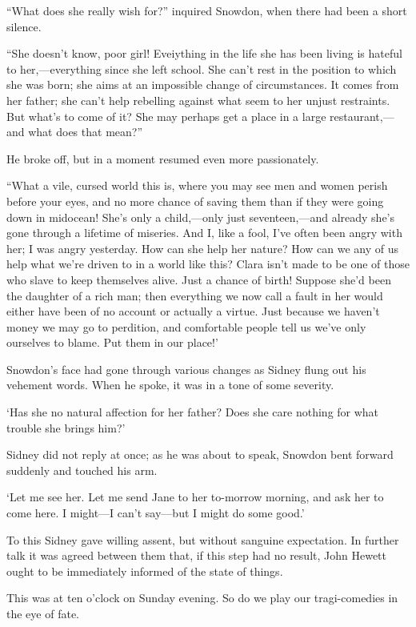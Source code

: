 ``What does she really wish for?'' inquired Snowdon, when there had been
a short silence.

``She doesn't know, poor girl! Eveiything in the life she has been
living is hateful to her,---everything since she left school. She can't
rest in the position to which she was born; she aims at an impossible
change of circumstances. It comes from her father; she can't help
rebelling against what seem to her unjust restraints. But what's to come
of it? She may perhaps get a place in a large restaurant,---and what
does that mean?''

He broke off, but in a moment resumed even more passionately.

``What a vile, cursed world this is, where you may see men and women
perish before your eyes, and no more chance of saving them than if they
were going down in midocean! She's only a child,---only just
seventeen,---and already she's gone through a lifetime of miseries. And
I, like a fool, I've {\protect\hypertarget{249}{}{}}often been angry
with her; I was angry yesterday. How can she help her nature? How can we
any of us help what we're driven to in a world like this? Clara isn't
made to be one of those who slave to keep themselves alive. Just a
chance of birth! Suppose she'd been the daughter of a rich man; then
everything we now call a fault in her would either have been of no
account or actually a virtue. Just because we haven't money we may go to
perdition, and comfortable people tell us we've only ourselves to blame.
Put them in our place!'

Snowdon's face had gone through various changes as Sidney flung out his
vehement words. When he spoke, it was in a tone of some severity.

`Has she no natural affection for her father? Does she care nothing for
what trouble she brings him?'

Sidney did not reply at once; as he was about to speak, Snowdon bent
forward suddenly and touched his arm.

`Let me see her. Let me send Jane to {\protect\hypertarget{250}{}{}}her
to-morrow morning, and ask her to come here. I might---I can't say---but
I might do some good.'

To this Sidney gave willing assent, but without sanguine expectation. In
further talk it was agreed between them that, if this step had no
result, John Hewett ought to be immediately informed of the state of
things.

This was at ten o'clock on Sunday evening. So do we play our
tragi-comedies in the eye of fate.

